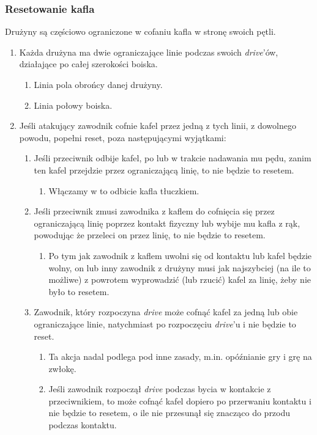 \documentclass[11pt,a4paper]{article}
\begin{document}
\subsubsection{Resetowanie kafla}
Drużyny są częściowo ograniczone w cofaniu kafla w stronę swoich pętli.
\begin{enumerate}
  \item Każda drużyna ma dwie ograniczające linie podczas swoich \emph{drive}'ów, działające po całej szerokości boiska.
  \begin{enumerate}
    \item Linia pola obrońcy danej drużyny.
    \item Linia połowy boiska.
  \end{enumerate}
  \item Jeśli atakujący zawodnik cofnie kafel przez jedną z tych linii, z dowolnego powodu, popełni reset, poza następującymi wyjątkami:
  \begin{enumerate}
    \item Jeśli przeciwnik odbije kafel, po lub w trakcie nadawania mu pędu, zanim ten kafel przejdzie przez ograniczającą linię, to nie będzie to resetem.
    \begin{enumerate}
      \item Włączamy w to odbicie kafla tłuczkiem.
    \end{enumerate}
    \item Jeśli przeciwnik zmusi zawodnika z kaflem do cofnięcia się przez ograniczającą linię poprzez kontakt fizyczny lub wybije mu kafla z rąk, powodując że przeleci on przez linię, to nie będzie to resetem.
    \begin{enumerate}
      \item Po tym jak zawodnik z kaflem uwolni się od kontaktu lub kafel będzie wolny, on lub inny zawodnik z drużyny musi jak najszybciej (na ile to możliwe) z powrotem wyprowadzić (lub rzucić) kafel za linię, żeby nie było to resetem.
    \end{enumerate}
    \item Zawodnik, który rozpoczyna \emph{drive} może cofnąć kafel za jedną lub obie ograniczające linie, natychmiast po rozpoczęciu \emph{drive}'u i nie będzie to reset.
    \begin{enumerate}
      \item Ta akcja nadal podlega pod inne zasady, m.in. opóźnianie gry i grę na zwłokę.
      \item Jeśli zawodnik rozpoczął \emph{drive} podczas bycia w kontakcie z przeciwnikiem, to może cofnąć kafel dopiero po przerwaniu kontaktu i nie będzie to resetem, o ile nie przesunął się znacząco do przodu podczas kontaktu.

\end{enumerate}
\end{enumerate}
\end{enumerate}
\end{document}
